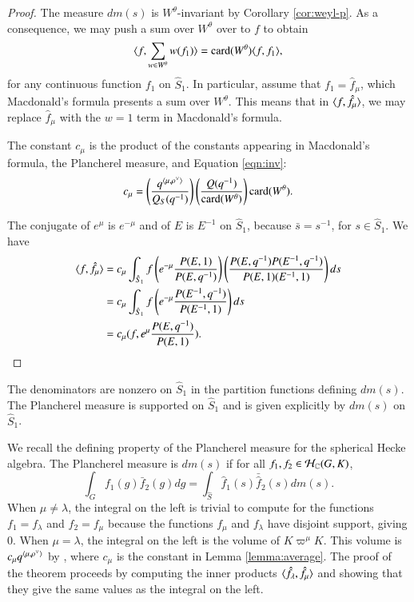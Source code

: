 \begin{proof}  
  The measure $dm(s)$ is $W^\theta$-invariant by Corollary
  \ref{cor:weyl-p}.  As a consequence, we may push a sum over
  $W^\theta$ over to $f$ to obtain
\begin{equation}\label{eqn:inv}
\langle{f,\sum_{w\in W^\theta} w(f_1)}\rangle = {\operatorname{card}}(W^\theta)\langle{f,f_1}\rangle,
\end{equation}
for any continuous function $f_1$ on $\hat S_1$.
In particular, assume that $f_1=\hat f_\mu$, which Macdonald's
formula presents a sum over $W^\theta$.
This means that in $\langle{f,\hat f_\mu}\rangle$, we may replace 
$\hat f_\mu$  with
the $w=1$ term  in Macdonald's formula.

The constant $c_\mu$ is the product of the constants appearing in
Macdonald's formula, the Plancherel measure, and Equation
\ref{eqn:inv}:
\[
c_\mu = \left(\frac{q^{\langle{\mu,\rho^\vee}\rangle}}{Q_S(q^{-1})}\right)\left(\frac{Q(q^{-1})}{{\operatorname{card}}(W^\theta)}\right) {\operatorname{card}}(W^\theta).
\]

The conjugate of $e^\mu$ is $e^{-\mu}$ and of $E$ is $E^{-1}$ on $\hat
S_1$, because $\bar s = s^{-1}$, for $s\in \hat S_1$.  We have
\begin{align*}
\langle{f,\hat f_\mu}\rangle &=
c_\mu\int_{\hat S_1} f \left(e^{-\mu} \frac{P(E,1)}{P(E,q^{-1})}\right) \left(\frac{P(E,q^{-1}) P(E^{-1},q^{-1})}{P(E,1)(E^{-1},1)}\right) ds\\
&=
c_\mu\int_{\hat S_1} f \left(e^{-\mu} \frac{P(E^{-1},q^{-1})}{P(E^{-1},1)}\right) ds\\
&=
c_\mu (f, e^\mu\frac{ P(E,q^{-1})}{P(E,1)}).
\end{align*}
\end{proof}

\begin{theorem}
  The denominators are nonzero on $\hat S_1$ in the partition
  functions defining $dm(s)$.  The Plancherel measure is supported on
  $\hat S_1$ and is given explicitly by $dm(s)$ on $\hat S_1$.
\end{theorem}

\begin{remark}
  We recall the defining property of the Plancherel measure for the
  spherical Hecke algebra.  The Plancherel measure is $dm(s)$ if for
  all $f_1,f_2\in \mathcal H_{\mathbb{C}}(G,K)$,
\[
\int_G f_1(g) \bar f_2 (g) dg = \int_{\hat S} \hat f_1(s) \bar {\hat f}_2 (s) dm(s).
\]
When $\mu\ne\lambda$, the integral on the left is trivial to compute
for the functions $f_1 = f_\lambda$ and $f_2 = f_\mu$ because the
functions $f_\mu$ and $f_\lambda$ have disjoint support, giving $0$.
When $\mu=\lambda$, the integral on the left is the volume of
$K\varpi^\mu K$.  This volume is $c_\mu q^{\langle{\mu,\rho^\vee}\rangle}$ by
\cite{casselman2005companion}, where $c_\mu$ is the constant in Lemma
\ref{lemma:average}.  The proof of the theorem proceeds by computing
the inner products $\langle{\hat f_\lambda,\hat f_\mu}\rangle$ and showing that
they give the same values as the integral on the left.
\end{remark}

